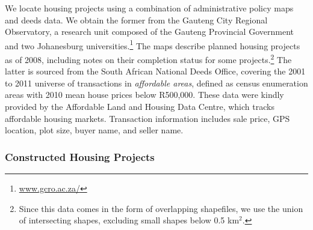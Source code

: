 \documentclass[12pt]{article}
\begin{document}
 We locate housing projects using a combination of administrative policy maps and deeds data. We obtain the former from the Gauteng City Regional Observatory, a research unit composed of the Gauteng Provincial Government and two Johanesburg universities.\footnote{\href{url}{www.gcro.ac.za/}} The maps describe planned housing projects as of 2008, including notes on their completion status for some projects.\footnote{Since this data comes in the form of overlapping shapefiles, we use the union of intersecting shapes, excluding small shapes below 0.5 km$^2$.} The latter is sourced from the South African National Deeds Office, covering the 2001 to 2011 universe of transactions in {\it affordable areas}, defined as census enumeration areas with 2010 mean house prices below R500,000. These data were kindly provided by the Affordable Land and Housing Data Centre, which tracks affordable housing markets. Transaction information includes sale price, GPS location, plot size, buyer name, and seller name.

% 

 \subsubsection*{Constructed Housing Projects}
\end{document}
